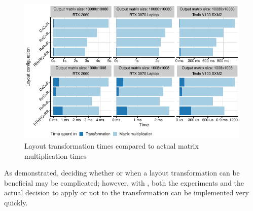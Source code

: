 \begin{figure}
    \centering
    \includegraphics{noarr/plots/matmul_transform.pdf}
    \caption{Layout transformation times compared to actual matrix multiplication times}
    \label{fig:matmul_comp}
\end{figure}

As demonstrated, deciding whether or when a layout transformation can be beneficial may be complicated; however, with \Noarr{}, both the experiments and the actual decision to apply or not to the transformation can be implemented very quickly.

